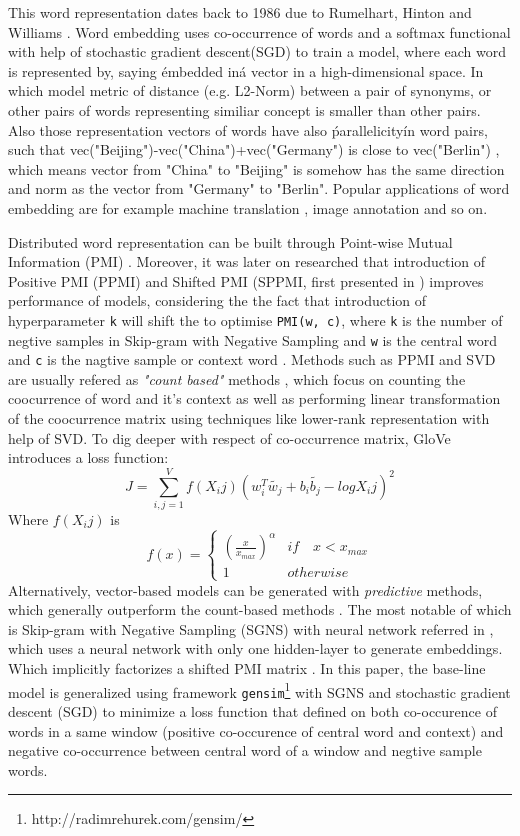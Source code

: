 \documentclass[11pt,a4paper]{article}
\begin{document}
This word representation dates back to 1986 due to Rumelhart, Hinton and Williams \cite{williams1986learning}. Word embedding uses co-occurrence of words and a softmax functional with help of stochastic gradient descent(SGD) to train a model, where each word is represented by, saying \'embedded in\' a vector in a high-dimensional space. In which model metric of distance (e.g. L2-Norm) between a pair of synonyms, or other pairs of words representing similiar concept is smaller than other pairs. Also those representation vectors of words have also \'parallelicity\' in word pairs, such that vec("Beijing")-vec("China")+vec("Germany") is close to vec("Berlin") \cite{le2014distributed}, which means vector from "China" to "Beijing" is somehow has the same direction and norm as the vector from "Germany" to "Berlin". Popular applications of word embedding are for example machine translation \cite{cho2014learning}, image annotation \cite{weston2011wsabie} and so on. 

Distributed word representation can be built through Point-wise Mutual Information (PMI) \cite{church1990word}. Moreover, it was later on researched that introduction of Positive PMI (PPMI) \cite{bullinaria2007extracting} and Shifted PMI (SPPMI, first presented in \cite{goldberg2014word2vec}) improves performance of models, considering the the fact that introduction of hyperparameter \verb|k| will shift the to optimise \verb|PMI(w, c)|, where \verb|k| is the number of negtive samples in Skip-gram with Negative Sampling and \verb|w| is the central word and \verb|c| is the nagtive sample or context word \cite{Levy2014neural}. Methods such as PPMI and SVD are usually refered as \emph{"count based"} methods \cite{levy2015improving}, which focus on counting the coocurrence of word and it's context as well as performing linear transformation of the coocurrence matrix using techniques like lower-rank representation with help of SVD. To dig deeper with respect of co-occurrence matrix, GloVe \cite{Pennington2014glove} introduces a loss function:
$$J=\sum_{i,j=1}^{V}f(X_ij)(w_i^T\tilde{w_j}+b_i\tilde{b_j}-logX_ij)^2$$
Where $f(X_ij)$ is
$$ f(x)=\left\{
    \begin{array}{rl}
    (\frac{x}{x_{max}})^\alpha & if\quad x<x_{max}\\
    1 & otherwise
    \end{array}
\right.
$$
Alternatively, vector-based models can be generated with \emph{predictive} methods, which generally outperform the count-based methods \cite{levy2015improving}. The most notable of which is Skip-gram with Negative Sampling (SGNS) with neural network referred in \cite{mikolov2013distributed}, which uses a neural network with only one hidden-layer to generate embeddings. Which implicitly factorizes a shifted PMI matrix \cite{levy2014neural}. In this paper, the base-line model is generalized using framework \verb|gensim|\footnote{http://radimrehurek.com/gensim/} with SGNS and stochastic gradient descent (SGD) to minimize a loss function that defined on both co-occurence of words in a same window (positive co-occurence of central word and context) and negative co-occurrence between central word of a window and negtive sample words. 
\end{document}
